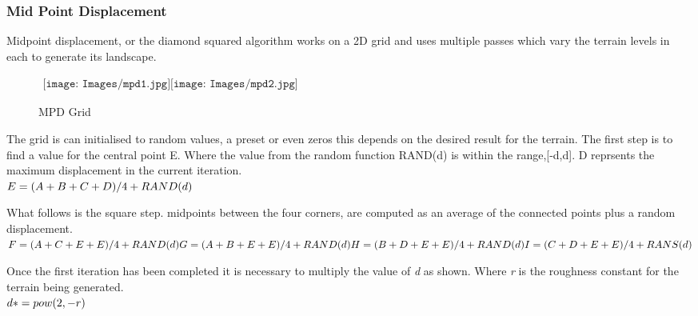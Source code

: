 \subsubsection*{Mid Point Displacement}
Midpoint displacement, or the diamond squared algorithm works on a 2D grid and uses
multiple passes which vary the terrain levels in each to generate its landscape.\\

\begin{figure}[h!]
\begin{center}$
\begin{array}{cc}
\texttt{[image: Images/mpd1.jpg]}
\texttt{[image: Images/mpd2.jpg]}
\end{array}$
\end{center}
\caption{MPD Grid}
\end{figure}

The grid is can initialised to random values, a preset or even zeros this depends on
the desired result for the terrain. The first step is to find a value for the central
point E. Where the value from the random function RAND(d) is within the range,[-d,d].
D reprsents the maximum displacement in the current iteration.\\

\begin{math}
E = (A+B+C+D) / 4 + RAND(d)\\
\end{math}

What follows is the square step. midpoints between the four corners, are computed as
an average of the connected points plus a random displacement.\\

\begin{math}
F = (A + C + E + E) / 4 + RAND(d)\\
G = (A + B + E + E) / 4 + RAND(d)\\
H = (B + D + E + E) / 4 + RAND(d)\\
I = (C + D + E + E) / 4 + RANS(d)\\
\end{math}

Once the first iteration has been completed it is necessary to multiply the value of
\emph{d} as shown. Where \emph{r} is the roughness constant for the terrain being
generated.\\

\begin{math}
d *= pow(2,-r)\\
\end{math}


